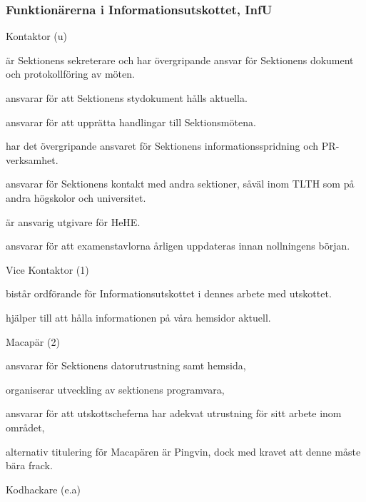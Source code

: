 \documentclass[10pt]{article}
\begin{document}
\subsubsection{Funktionärerna i Informationsutskottet, InfU}
\begin{emptylist}
    \item Kontaktor (u)
        \begin{dashlist}
            \item är Sektionens sekreterare och har övergripande ansvar för Sektionens dokument och protokollföring av möten.
            \item ansvarar för att Sektionens stydokument hålls aktuella.
            \item ansvarar för att upprätta handlingar till Sektionsmötena.
            \item har det övergripande ansvaret för Sektionens informationsspridning och PR-verksamhet.
            \item ansvarar för Sektionens kontakt med andra sektioner, såväl inom TLTH som på andra högskolor och universitet.
            \item är ansvarig utgivare för HeHE.
            \item ansvarar för att examenstavlorna årligen uppdateras innan nollningens början.
        \end{dashlist}
    \item Vice Kontaktor (1)
        \begin{dashlist}
            \item bistår ordförande för Informationsutskottet i dennes arbete med utskottet.
            \item hjälper till att hålla informationen på våra hemsidor aktuell.
        \end{dashlist}
    \item Macapär (2)
        \begin{dashlist}
            \item ansvarar för Sektionens datorutrustning samt hemsida,
            \item organiserar utveckling av sektionens programvara,
            \item ansvarar för att utskottscheferna har adekvat utrustning
                för sitt arbete inom området,
            \item alternativ titulering för Macapären är Pingvin, dock
                med kravet att denne måste bära frack.
        \end{dashlist}
	\item Kodhackare (e.a)

\end{emptylist}
\end{document}
